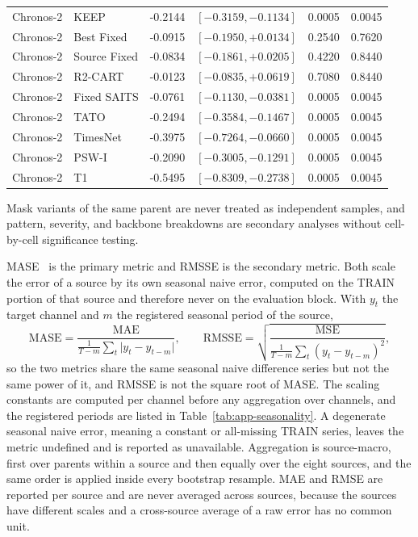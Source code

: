 \documentclass{article}
\begin{document}
\begin{table}[htbp]
\begin{tabular*}{\textwidth}{@{\extracolsep{\fill}}llrrrr@{}}
Chronos-2 & KEEP & -0.2144 & $[-0.3159,-0.1134]$ & 0.0005 & 0.0045 \\
Chronos-2 & Best Fixed & -0.0915 & $[-0.1950,+0.0134]$ & 0.2540 & 0.7620 \\
Chronos-2 & Source Fixed & -0.0834 & $[-0.1861,+0.0205]$ & 0.4220 & 0.8440 \\
Chronos-2 & R2-CART & -0.0123 & $[-0.0835,+0.0619]$ & 0.7080 & 0.8440 \\
Chronos-2 & Fixed SAITS & -0.0761 & $[-0.1130,-0.0381]$ & 0.0005 & 0.0045 \\
Chronos-2 & TATO & -0.2494 & $[-0.3584,-0.1467]$ & 0.0005 & 0.0045 \\
Chronos-2 & TimesNet & -0.3975 & $[-0.7264,-0.0660]$ & 0.0005 & 0.0045 \\
Chronos-2 & PSW-I & -0.2090 & $[-0.3005,-0.1291]$ & 0.0005 & 0.0045 \\
Chronos-2 & T1 & -0.5495 & $[-0.8309,-0.2738]$ & 0.0005 & 0.0045 \\
\bottomrule
  \end{tabular*}
\end{table}

Mask variants of the same parent are never
treated as independent samples, and pattern, severity, and backbone breakdowns are secondary
analyses without cell-by-cell significance testing.

MASE~\citep{hyndman2006mase} is the primary metric and RMSSE is the secondary metric. Both
scale the error of a source by its own seasonal naive error, computed on the TRAIN portion of
that source and therefore never on the evaluation block. With $y_t$ the target channel and $m$
the registered seasonal period of the source,
\begin{equation}
  \mathrm{MASE} = \frac{\mathrm{MAE}}{\frac{1}{T-m}\sum_{t} \lvert y_t - y_{t-m} \rvert},
  \qquad
  \mathrm{RMSSE} = \sqrt{\frac{\mathrm{MSE}}{\frac{1}{T-m}\sum_{t} (y_t - y_{t-m})^2}},
  \label{eq:metrics}
\end{equation}
so the two metrics share the same seasonal naive difference series but not the same power of
it, and RMSSE is not the square root of MASE. The scaling constants are computed per channel
before any aggregation over channels, and the registered periods are listed in
Table~\ref{tab:app-seasonality}. A degenerate seasonal naive error, meaning a constant or
all-missing TRAIN series, leaves the metric undefined and is reported as unavailable. Aggregation is source-macro, first over parents within a source and then equally over
the eight sources, and the same order is applied inside every bootstrap resample. MAE and RMSE
are reported per source and are never averaged across sources, because the sources have
different scales and a cross-source average of a raw error has no common unit.
\end{document}
